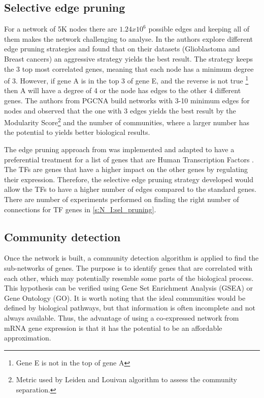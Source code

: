 \subsection{Selective edge pruning}

For a network of 5K nodes there are $1.24x10^6$ possible edges and keeping all of them makes the network challenging to analyse. In \citet{Care2019-ij} the authors explore different edge pruning strategies and found that on their datasets (Glioblastoma and Breast cancers) an aggressive strategy yields the best result. The strategy keeps the 3 top most correlated genes, meaning that each node has a minimum degree of 3. However, if gene A is in the top 3 of gene E, and the reverse is not true \footnote{Gene E is not in the top of gene A} then A will have a degree of 4 or the node has edges to the other 4 different genes. The authors from PGCNA build networks with 3-10 minimum edges for nodes and observed that the one with 3 edges yields the best result by the Modularity Score\footnote{Metric used by Leiden and Louivan algorithm to assess the community separation.} and the number of communities, where a larger number has the potential to yields better biological results.

The edge pruning approach from \citet{Care2019-ij} was implemented and adapted to have a preferential treatment for a list of genes that are Human Transcription Factors \citet{Lambert2018-el}. The TFs are genes that have a higher impact on the other genes by regulating their expression. Therefore, the selective edge pruning strategy developed would allow the TFs to have a higher number of edges compared to the standard genes. There are number of experiments performed on finding the right number of connections for TF genes in \cref{s:N_I:sel_pruning}.

\subsection{Community detection}

Once the network is built, a community detection algorithm is applied to find the sub-networks of genes. The purpose is to identify genes that are correlated with each other, which may potentially resemble some parts of the biological process. This hypothesis can be verified using Gene Set Enrichment Analysis (GSEA) or Gene Ontology (GO). It is worth noting that the ideal communities would be defined by biological pathways, but that information is often incomplete and not always available. Thus, the advantage of using a co-expressed network from mRNA gene expression is that it has the potential to be an affordable approximation.



